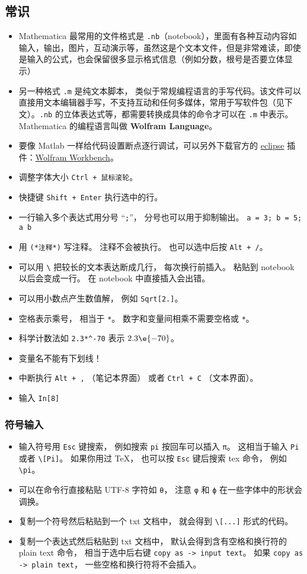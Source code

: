 \subsection{常识}
\begin{itemize}
\item Mathematica 最常用的文件格式是 \verb`.nb`（notebook），里面有各种互动内容如输入，输出，图片，互动演示等，虽然这是个文本文件，但是非常难读，即使是输入的公式，也会保留很多显示格式信息（例如分数，根号是否要立体显示）
\item 另一种格式 \verb`.m` 是纯文本脚本， 类似于常规编程语言的手写代码。该文件可以直接用文本编辑器手写，不支持互动和任何多媒体，常用于写软件包（见下文）。\verb`.nb` 的立体表达式等，都需要转换成具体的命令才可以在 \verb`.m` 中表示。 Mathematica 的编程语言叫做 \textbf{Wolfram Language}。
\item 要像 Matlab 一样给代码设置断点逐行调试，可以另外下载官方的 \href{https://www.eclipse.org/}{eclipse} 插件：\href{https://www.wolfram.com/workbench/}{Wolfram Workbench}。
\item 调整字体大小 \verb`Ctrl + 鼠标滚轮`。
\item 快捷键 \verb`Shift + Enter` 执行选中的行。
\item 一行输入多个表达式用分号 “\verb`;`”， 分号也可以用于抑制输出。 \verb`a = 3; b = 5; a b`
\item 用 \verb`(*注释*)` 写注释。 注释不会被执行。 也可以选中后按 \verb`Alt + /`。
\item 可以用 \verb`\` 把较长的文本表达断成几行， 每次换行前插入。 粘贴到 notebook 以后会变成一行。 在 notebook 中直接插入会出错。
\item 可以用小数点产生数值解， 例如 \verb`Sqrt[2.]`。
\item 空格表示乘号， 相当于 \verb`*`。 数字和变量间相乘不需要空格或 \verb`*`。
\item 科学计数法如 \verb`2.3*^-70` 表示 $2.3\e{-70}$。
\item 变量名不能有下划线！
\item 中断执行 \verb`Alt + ,` （笔记本界面） 或者 \verb`Ctrl + C` （文本界面）。
\item 输入 \verb`In[8]`
\end{itemize}

\subsubsection{符号输入}
\begin{itemize}
\item 输入符号用 \verb`Esc` 键搜索， 例如搜索 \verb`pi` 按回车可以插入 \verb`π`。 这相当于输入 \verb`Pi` 或者 \verb`\[Pi]`。 如果你用过 TeX， 也可以按 \verb`Esc` 键后搜索 tex 命令， 例如 \verb`\pi`。
\item 可以在命令行直接粘贴 UTF-8 字符如 \verb`θ`， 注意 \verb`φ` 和 \verb`ϕ` 在一些字体中的形状会调换。
\item 复制一个符号然后粘贴到一个 txt 文档中， 就会得到 \verb`\[...]` 形式的代码。
\item 复制一个表达式然后粘贴到 txt 文档中， 默认会得到含有空格和换行符的 plain text 命令， 相当于选中后右键 \verb`copy as -> input text`。 如果 \verb`copy as -> plain text`， 一些空格和换行符将不会插入。
\end{itemize}

